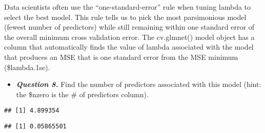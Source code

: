 \documentclass[
]{article}
\newenvironment{Shaded}{\begin{snugshade}}{\end{snugshade}}
\newcommand{\CommentTok}[1]{\textcolor[rgb]{0.56,0.35,0.01}{\textit{#1}}}
\newcommand{\FloatTok}[1]{\textcolor[rgb]{0.00,0.00,0.81}{#1}}
\newcommand{\NormalTok}[1]{#1}
\newcommand{\SpecialCharTok}[1]{\textcolor[rgb]{0.00,0.00,0.00}{#1}}
\providecommand{\tightlist}{%
  \setlength{\itemsep}{0pt}\setlength{\parskip}{0pt}}
\begin{document}
Data scientists often use the ``one-standard-error'' rule when tuning
lambda to select the best model. This rule tells us to pick the most
parsimonious model (fewest number of predictors) while still remaining
within one standard error of the overall minimum cross validation error.
The cv.glmnet() model object has a column that automatically finds the
value of lambda associated with the model that produces an MSE that is
one standard error from the MSE minimum (\$lambda.1se).

\begin{itemize}
\tightlist
\item
  \textbf{\emph{Question 8.}} Find the number of predictors associated
  with this model (hint: the \$nzero is the \# of predictors column).
\end{itemize}

\begin{Shaded}
\end{Shaded}

\begin{verbatim}
## [1] 4.899354
\end{verbatim}

\begin{Shaded}
\end{Shaded}

\begin{verbatim}
## [1] 0.05865501
\end{verbatim}

\begin{Shaded}
\end{Shaded}
\end{document}
